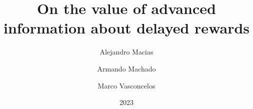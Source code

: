 \documentclass[a4paper,12pt]{article}
\title{On the value of advanced information about delayed rewards}
\author{Alejandro Macias \and Armando Machado \and Marco Vasconcelos}
\date{2023}
\begin{document}
{\scshape\bfseries \maketitle}
\end{document}
